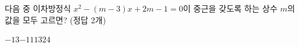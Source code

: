 다음 중 이차방정식 $x^2-(m-3)x+2m-1=0$이 중근을 갖도록 하는 상수 $m$의 값을 모두 고르면? (정답 2개)
\begin{choices32}{$-13$}{$-1$}{$1$}{$13$}{$24$}\end{choices32}
